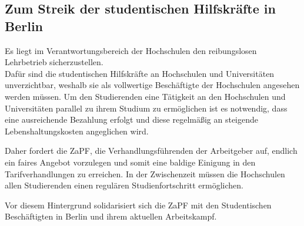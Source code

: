
\subsection{Zum Streik der studentischen Hilfskräfte in Berlin}
Es liegt im Verantwortungsbereich der Hochschulen den	reibungslosen
Lehrbetrieb	sicherzustellen.\\
Dafür sind die studentischen Hilfskräfte an	Hochschulen	und
Universitäten	unverzichtbar, weshalb sie als vollwertige Beschäftigte	der	Hochschulen	angesehen
werden	müssen.	Um	den	Studierenden	eine	Tätigkeit	an	den	Hochschulen	und	Universitäten	parallel
zu	ihrem	Studium	zu	ermöglichen	ist	es	notwendig,	dass	eine	ausreichende	Bezahlung	erfolgt	und
diese	regelmäßig	an	steigende	Lebenshaltungskosten	angeglichen	wird.

Daher	fordert	die	ZaPF, die Verhandlungsführenden der Arbeitgeber auf,	endlich	ein	faires	Angebot	vorzulegen	und	somit	eine
baldige	Einigung	in	den	Tarifverhandlungen	zu	erreichen.	In	der	Zwischenzeit	müssen	die
Hochschulen	allen	Studierenden	einen	regulären	Studienfortschritt	ermöglichen.

Vor	diesem	Hintergrund	solidarisiert	sich	die	ZaPF	mit	den	Studentischen	Beschäftigten	in	Berlin
und	ihrem	aktuellen	Arbeitskampf.

